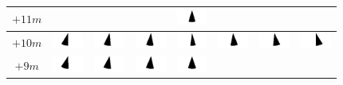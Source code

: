 \begin{tabular}{|c|c|c|c|c|c|c|c|}
	\hline
	$+11m$ & & & &
	\includegraphics[width=1cm]{img_Bereich/V1_img_res_Winkel_X_0_11000.png}& & &\\ 
	\hline 
	$+10m$ &
	\includegraphics[width=1cm]{img_Bereich/V1_img_res_Winkel_X_-3000_10000.png} &
	\includegraphics[width=1cm]{img_Bereich/V1_img_res_Winkel_X_-2000_10000.png}&
	\includegraphics[width=1cm]{img_Bereich/V1_img_res_Winkel_X_-1000_10000.png}&
	\includegraphics[width=1cm]{img_Bereich/V1_img_res_Winkel_X_0_10000.png}&
	\includegraphics[width=1cm]{img_Bereich/V1_img_res_Winkel_X_1000_10000.png}&
	\includegraphics[width=1cm]{img_Bereich/V1_img_res_Winkel_X_2000_10000.png}&
	\includegraphics[width=1cm]{img_Bereich/V1_img_res_Winkel_X_3000_10000.png}\\ 
	\hline 
	$+9m$ &
	\includegraphics[width=1cm]{img_Bereich/V1_img_res_Winkel_X_-3000_9000.png} &
	\includegraphics[width=1cm]{img_Bereich/V1_img_res_Winkel_X_-2000_9000.png}&
	\includegraphics[width=1cm]{img_Bereich/V1_img_res_Winkel_X_-1000_9000.png}&
	\includegraphics[width=1cm]{img_Bereich/V1_img_res_Winkel_X_0_9000.png}&

\end{tabular}
